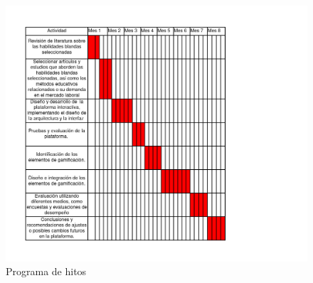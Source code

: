 \begin{figure}[ht]
    \centering
    \includegraphics[width=25cm]{Imagenes/tabla-hitos.jpg}
    \caption{Programa de hitos}
\end{figure}